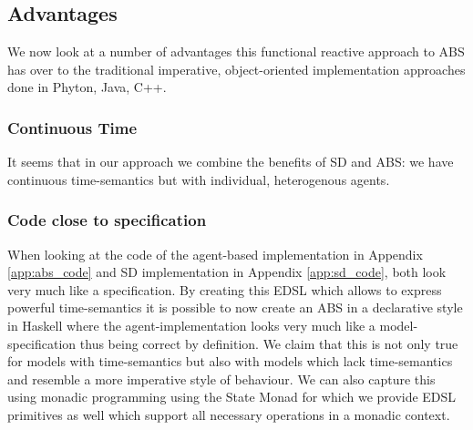 \subsection{Advantages}
We now look at a number of advantages this functional reactive approach to ABS has over to the traditional imperative, object-oriented implementation approaches done in Phyton, Java, C++.

\subsubsection{Continuous Time}
It seems that in our approach we combine the benefits of SD and ABS: we have continuous time-semantics but with individual, heterogenous agents.

\subsubsection{Code close to specification}
When looking at the code of the agent-based implementation in Appendix \ref{app:abs_code} and SD implementation in Appendix \ref{app:sd_code}, both look very much like a specification. By creating this EDSL which allows to express powerful time-semantics it is possible to now create an ABS in a declarative style in Haskell where the agent-implementation looks very much like a model-specification thus being correct by definition.
We claim that this is not only true for models with time-semantics but also with models which lack time-semantics and resemble a more imperative style of behaviour. We can also capture this using monadic programming using the State Monad for which we provide EDSL primitives as well which support all necessary operations in a monadic context.

